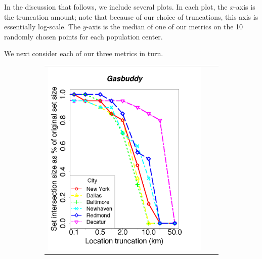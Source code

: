 In the discussion that follows, we include several plots. In each
plot, the $x$-axis is the truncation amount; note that because of our
choice of truncations, this axis is essentially log-scale.  The $y$-axis
is the median of one of our metrics on the 10 randomly chosen points
for each population center.

We next consider each of our three metrics in turn.

\begin{figure}[t!]
  \centering

  \begin{subfigure}[t]{\textwidth} 
    \begin{tabular}{ccc}
    
    \begin{minipage}{2in}
      \includegraphics[width=\textwidth]
                      {location_privacy/data/gasbuddy/plots/medians_across_city_si_20}
    \end{minipage}
    

\end{tabular}
\end{subfigure}
\end{figure}
